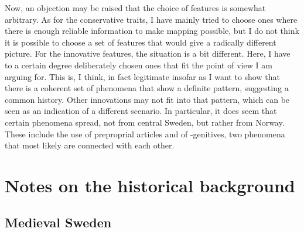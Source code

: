 Now, an objection may be raised that the choice of features is somewhat arbitrary. As for the conservative traits, I have mainly tried to choose ones where there is enough reliable information to make mapping possible, but I do not think it is possible to choose a set of features that would give a radically different picture. For the innovative features, the situation is a bit different. Here, I have to a certain degree deliberately chosen ones that fit the point of view I am arguing for. This is, I think, in fact legitimate insofar as I want to show that there is a coherent set of phenomena that show a definite pattern, suggesting a common history. Other innovations may not fit into that pattern, which can be seen as an indication of a different scenario. In particular, it does seem that certain phenomena spread, not from central Sweden, but rather from Norway. These include the use of preproprial articles and of -genitives, two phenomena that most likely are connected with each other. 

\section{Notes on the historical background}
\subsection{Medieval Sweden}

